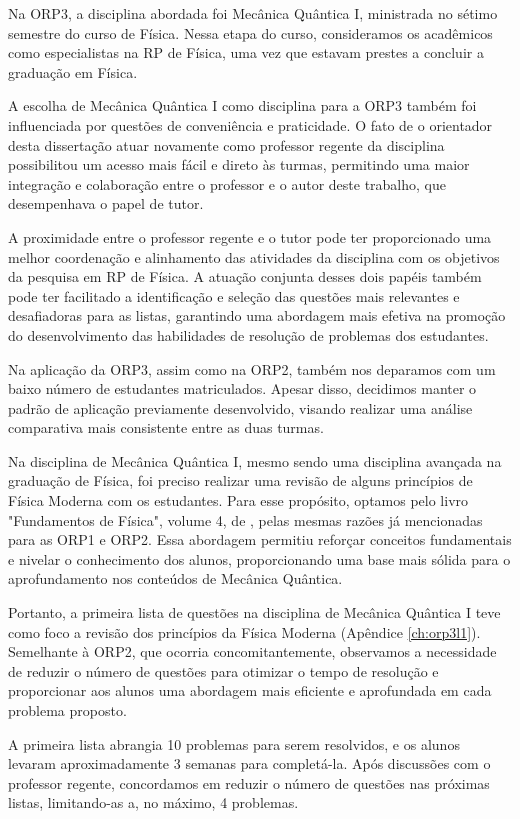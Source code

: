 Na ORP3, a disciplina abordada foi Mecânica Quântica I, ministrada no sétimo semestre do curso de Física. Nessa etapa do curso, consideramos os acadêmicos como especialistas na RP de Física, uma vez que estavam prestes a concluir a graduação em Física.

A escolha de Mecânica Quântica I como disciplina para a ORP3 também foi influenciada por questões de conveniência e praticidade. O fato de o orientador desta dissertação atuar novamente como professor regente da disciplina possibilitou um acesso mais fácil e direto às turmas, permitindo uma maior integração e colaboração entre o professor e o autor deste trabalho, que desempenhava o papel de tutor.

A proximidade entre o professor regente e o tutor pode ter proporcionado uma melhor coordenação e alinhamento das atividades da disciplina com os objetivos da pesquisa em RP de Física. A atuação conjunta desses dois papéis também pode ter facilitado a identificação e seleção das questões mais relevantes e desafiadoras para as listas, garantindo uma abordagem mais efetiva na promoção do desenvolvimento das habilidades de resolução de problemas dos estudantes.

Na aplicação da ORP3, assim como na ORP2, também nos deparamos com um baixo número de estudantes matriculados. Apesar disso, decidimos manter o padrão de aplicação previamente desenvolvido, visando realizar uma análise comparativa mais consistente entre as duas turmas.


Na disciplina de Mecânica Quântica I, mesmo sendo uma disciplina avançada na graduação de Física, foi preciso realizar uma revisão de alguns princípios de Física Moderna com os estudantes. Para esse propósito, optamos pelo livro "Fundamentos de Física", volume 4, de , pelas mesmas razões já mencionadas para as ORP1 e ORP2. Essa abordagem permitiu reforçar conceitos fundamentais e nivelar o conhecimento dos alunos, proporcionando uma base mais sólida para o aprofundamento nos conteúdos de Mecânica Quântica.

Portanto, a primeira lista de questões na disciplina de Mecânica Quântica I teve como foco a revisão dos princípios da Física Moderna (Apêndice \ref{ch:orp3l1}). Semelhante à ORP2, que ocorria concomitantemente, observamos a necessidade de reduzir o número de questões para otimizar o tempo de resolução e proporcionar aos alunos uma abordagem mais eficiente e aprofundada em cada problema proposto.

A primeira lista abrangia 10 problemas para serem resolvidos, e os alunos levaram aproximadamente 3 semanas para completá-la. Após discussões com o professor regente, concordamos em reduzir o número de questões nas próximas listas, limitando-as a, no máximo, 4 problemas. 

